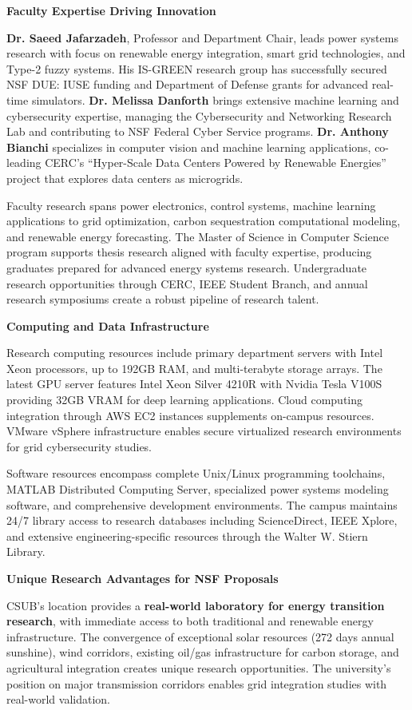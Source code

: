 \documentclass[11pt]{article}
\begin{document}
\textbf{Faculty Expertise Driving Innovation}

\textbf{Dr. Saeed Jafarzadeh}, Professor and Department Chair, leads power systems research with focus on renewable energy integration, smart grid technologies, and Type-2 fuzzy systems. His IS-GREEN research group has successfully secured NSF DUE: IUSE funding and Department of Defense grants for advanced real-time simulators. \textbf{Dr. Melissa Danforth} brings extensive machine learning and cybersecurity expertise, managing the Cybersecurity and Networking Research Lab and contributing to NSF Federal Cyber Service programs. \textbf{Dr. Anthony Bianchi} specializes in computer vision and machine learning applications, co-leading CERC's ``Hyper-Scale Data Centers Powered by Renewable Energies'' project that explores data centers as microgrids.

Faculty research spans power electronics, control systems, machine learning applications to grid optimization, carbon sequestration computational modeling, and renewable energy forecasting. The Master of Science in Computer Science program supports thesis research aligned with faculty expertise, producing graduates prepared for advanced energy systems research. Undergraduate research opportunities through CERC, IEEE Student Branch, and annual research symposiums create a robust pipeline of research talent.

\textbf{Computing and Data Infrastructure}

Research computing resources include primary department servers with Intel Xeon processors, up to 192GB RAM, and multi-terabyte storage arrays. The latest GPU server features Intel Xeon Silver 4210R with Nvidia Tesla V100S providing 32GB VRAM for deep learning applications. Cloud computing integration through AWS EC2 instances supplements on-campus resources. VMware vSphere infrastructure enables secure virtualized research environments for grid cybersecurity studies.

Software resources encompass complete Unix/Linux programming toolchains, MATLAB Distributed Computing Server, specialized power systems modeling software, and comprehensive development environments. The campus maintains 24/7 library access to research databases including ScienceDirect, IEEE Xplore, and extensive engineering-specific resources through the Walter W. Stiern Library.

\textbf{Unique Research Advantages for NSF Proposals}

CSUB's location provides a \textbf{real-world laboratory for energy transition research}, with immediate access to both traditional and renewable energy infrastructure. The convergence of exceptional solar resources (272 days annual sunshine), wind corridors, existing oil/gas infrastructure for carbon storage, and agricultural integration creates unique research opportunities. The university's position on major transmission corridors enables grid integration studies with real-world validation.
\end{document}
